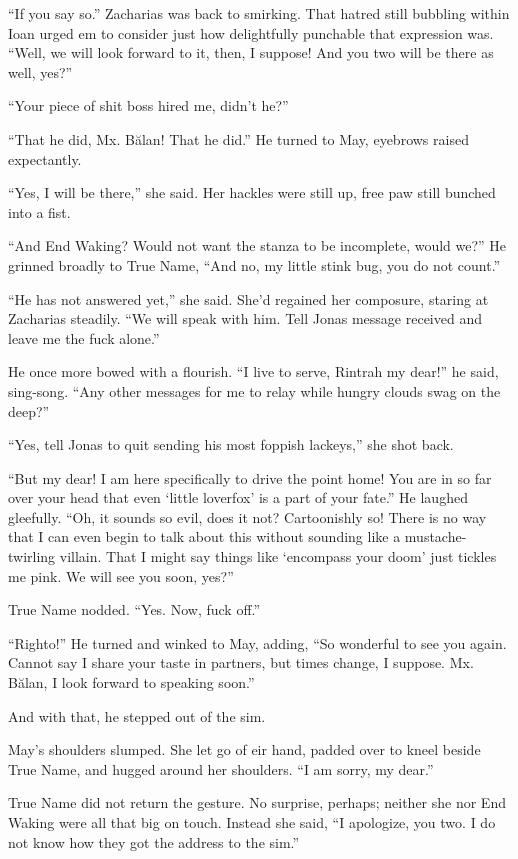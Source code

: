``If you say so.'' Zacharias was back to smirking. That hatred still bubbling within Ioan urged em to consider just how delightfully punchable that expression was. ``Well, we will look forward to it, then, I suppose! And you two will be there as well, yes?''

``Your piece of shit boss hired me, didn't he?''

``That he did, Mx. Bălan! That he did.'' He turned to May, eyebrows raised expectantly.

``Yes, I will be there,'' she said. Her hackles were still up, free paw still bunched into a fist.

``And End Waking? Would not want the stanza to be incomplete, would we?'' He grinned broadly to True Name, ``And no, my little stink bug, you do not count.''

``He has not answered yet,'' she said. She'd regained her composure, staring at Zacharias steadily. ``We will speak with him. Tell Jonas message received and leave me the fuck alone.''

He once more bowed with a flourish. ``I live to serve, Rintrah my dear!'' he said, sing-song. ``Any other messages for me to relay while hungry clouds swag on the deep?''

``Yes, tell Jonas to quit sending his most foppish lackeys,'' she shot back.

``But my dear! I am here specifically to drive the point home! You are in so far over your head that even `little loverfox' is a part of your fate.'' He laughed gleefully. ``Oh, it sounds so evil, does it not? Cartoonishly so! There is no way that I can even begin to talk about this without sounding like a mustache-twirling villain. That I might say things like `encompass your doom' just tickles me pink. We will see you soon, yes?''

True Name nodded. ``Yes. Now, fuck off.''

``Righto!'' He turned and winked to May, adding, ``So wonderful to see you again. Cannot say I share your taste in partners, but times change, I suppose. Mx. Bălan, I look forward to speaking soon.''

And with that, he stepped out of the sim.

May's shoulders slumped. She let go of eir hand, padded over to kneel beside True Name, and hugged around her shoulders. ``I am sorry, my dear.''

True Name did not return the gesture. No surprise, perhaps; neither she nor End Waking were all that big on touch. Instead she said, ``I apologize, you two. I do not know how they got the address to the sim.''

